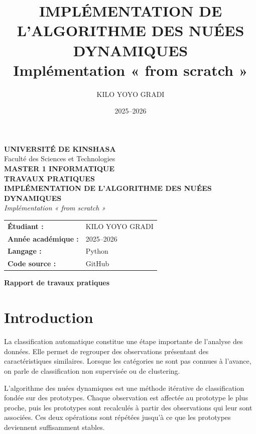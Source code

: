 \documentclass[12pt,a4paper]{article}
\title{\textbf{IMPLÉMENTATION DE L'ALGORITHME DES NUÉES DYNAMIQUES}\\
\large Implémentation « from scratch »}
\author{KILO YOYO GRADI}
\date{2025--2026}
\begin{document}
\begin{titlepage}
\centering
\vspace*{1.5cm}

{\Large \textbf{UNIVERSITÉ DE KINSHASA}}\\[0.4cm]
{\large Faculté des Sciences et Technologies}\\[0.5cm]
{\large \textbf{MASTER 1 INFORMATIQUE}}\\[2cm]

{\Huge \textbf{TRAVAUX PRATIQUES}}\\[0.8cm]
{\LARGE \textbf{IMPLÉMENTATION DE L'ALGORITHME DES NUÉES DYNAMIQUES}}\\[0.5cm]
{\large \textit{Implémentation « from scratch »}}\\[2cm]

\begin{tabular}{ll}
\textbf{Étudiant :} & KILO YOYO GRADI\\[0.4cm]
\textbf{Année académique :} & 2025--2026\\[0.4cm]
\textbf{Langage :} & Python\\[0.4cm]
\textbf{Code source :} & GitHub
\end{tabular}

\vfill
{\large \textbf{Rapport de travaux pratiques}}
\end{titlepage}

\tableofcontents
\newpage

\section{Introduction}

La classification automatique constitue une étape importante de l'analyse des données. Elle permet de regrouper des observations présentant des caractéristiques similaires. Lorsque les catégories ne sont pas connues à l'avance, on parle de classification non supervisée ou de clustering.

L'algorithme des nuées dynamiques est une méthode itérative de classification fondée sur des prototypes. Chaque observation est affectée au prototype le plus proche, puis les prototypes sont recalculés à partir des observations qui leur sont associées. Ces deux opérations sont répétées jusqu'à ce que les prototypes deviennent suffisamment stables.
\end{document}
